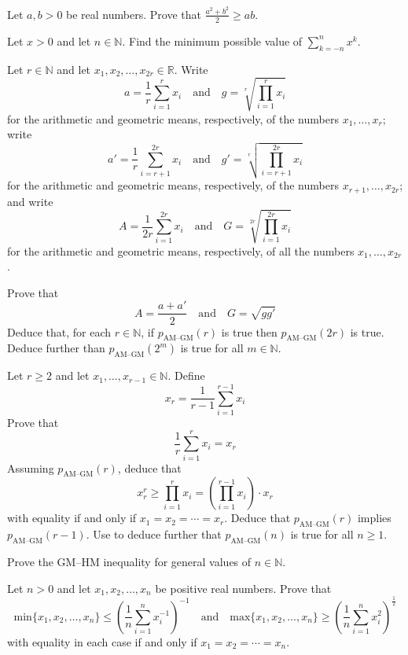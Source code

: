 \begin{exercise}
Let $a,b > 0$ be real numbers. Prove that $\displaystyle \frac{a^2+b^2}{2} \ge ab$.
\end{exercise}


\begin{exercise}
Let $x>0$ and let $n \in \mathbb{N}$. Find the minimum possible value of $\displaystyle \sum_{k=-n}^n x^k$.
\end{exercise}


\begin{exercise}
\label{exAMGMForPowersOf2}
Let $r \in \mathbb{N}$ and let $x_1,x_2,\dots,x_{2r} \in \mathbb{R}$. Write
\[ a = \frac{1}{r} \sum_{i=1}^r x_i \quad \text{and} \quad g = \sqrt[r]{\prod_{i=1}^r x_i} \]
for the arithmetic and geometric means, respectively, of the numbers $x_1,\dots,x_r$; write
\[ a' = \frac{1}{r} \sum_{i=r+1}^{2r} x_i \quad \text{and} \quad g' = \sqrt[r]{\prod_{i=r+1}^{2r} x_i} \]
for the arithmetic and geometric means, respectively, of the numbers $x_{r+1},\dots,x_{2r}$; and write
\[ A = \frac{1}{2r} \sum_{i=1}^{2r} x_i \quad \text{and} \quad G = \sqrt[2r]{\prod_{i=1}^{2r} x_i} \]
for the arithmetic and geometric means, respectively, of all the numbers $x_1,\dots,x_{2r}$.

Prove that
\[ A = \frac{a+a'}{2} \quad \text{and} \quad G=\sqrt{gg'} \]
Deduce that, for each $r \in \mathbb{N}$, if $p_{\text{AM--GM}}(r)$ is true then $p_{\text{AM--GM}}(2r)$ is true. Deduce further than $p_{\text{AM--GM}}(2^m)$ is true for all $m \in \mathbb{N}$.
\end{exercise}

\begin{exercise}
\label{exAMGMForPredecessors}
Let $r \ge 2$ and let $x_1,\dots,x_{r-1} \in \mathbb{N}$. Define
\[ x_r = \frac{1}{r-1} \sum_{i=1}^{r-1} x_i \]
Prove that
\[ \frac{1}{r}\sum_{i=1}^r x_i = x_r \]
Assuming $p_{\text{AM--GM}}(r)$, deduce that
\[ x_r^r \ge \prod_{i=1}^r x_i = \left(\prod_{i=1}^{r-1} x_i\right) \cdot x_r \]
with equality if and only if $x_1=x_2=\cdots=x_r$. Deduce that $p_{\text{AM--GM}}(r)$ implies $p_{\text{AM--GM}}(r-1)$. Use  to deduce further that $p_{\text{AM--GM}}(n)$ is true for all $n \ge 1$.
\end{exercise}


\begin{exercise}
Prove the GM--HM inequality for general values of $n \in \mathbb{N}$.
\end{exercise}

\begin{exercise}
\label{exMinMeanMaxInequalities}
Let $n > 0$ and let $x_1,x_2,\dots,x_n$ be positive real numbers. Prove that
\[ \mathrm{min} \{ x_1,x_2,\dots,x_n \} \le \left( \frac{1}{n} \sum_{i=1}^n x_i^{-1} \right)^{-1} \quad \text{and} \quad \mathrm{max} \{ x_1,x_2,\dots,x_n \} \ge \left( \frac{1}{n} \sum_{i=1}^n x_i^2 \right)^{\frac{1}{2}} \]
with equality in each case if and only if $x_1=x_2=\cdots=x_n$.
\end{exercise}
